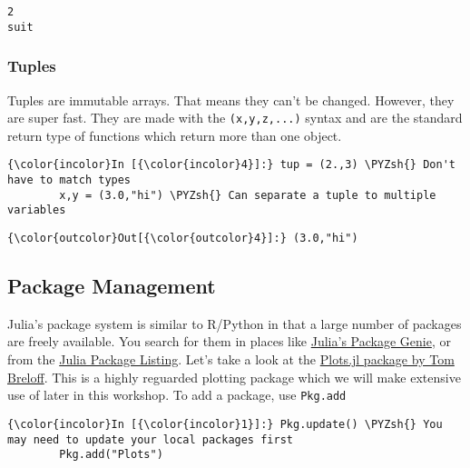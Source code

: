 \documentclass[11pt]{article}
\def\PYZsh{\char`\#}
\begin{document}
    \begin{Verbatim}[commandchars=\\\{\}]
2
suit

    \end{Verbatim}

    \subsubsection{Tuples}\label{tuples}

Tuples are immutable arrays. That means they can't be changed. However,
they are super fast. They are made with the \texttt{(x,y,z,...)} syntax
and are the standard return type of functions which return more than one
object.

    \begin{Verbatim}[commandchars=\\\{\}]
{\color{incolor}In [{\color{incolor}4}]:} tup = (2.,3) \PYZsh{} Don't have to match types
        x,y = (3.0,"hi") \PYZsh{} Can separate a tuple to multiple variables
\end{Verbatim}

            \begin{Verbatim}[commandchars=\\\{\}]
{\color{outcolor}Out[{\color{outcolor}4}]:} (3.0,"hi")
\end{Verbatim}
        
    \subsection{Package Management}\label{package-management}

Julia's package system is similar to R/Python in that a large number of
packages are freely available. You search for them in places like
\href{http://genieframework.com/packages}{Julia's Package Genie}, or
from the \href{http://pkg.julialang.org/}{Julia Package Listing}. Let's
take a look at the \href{https://github.com/tbreloff/Plots.jl}{Plots.jl
package by Tom Breloff}. This is a highly reguarded plotting package
which we will make extensive use of later in this workshop. To add a
package, use \texttt{Pkg.add}

    \begin{Verbatim}[commandchars=\\\{\}]
{\color{incolor}In [{\color{incolor}1}]:} Pkg.update() \PYZsh{} You may need to update your local packages first
        Pkg.add("Plots")
\end{Verbatim}
\end{document}
